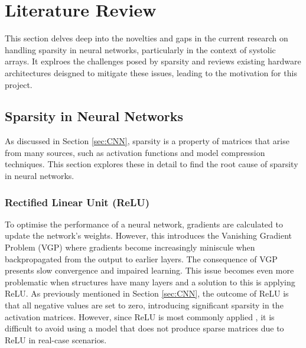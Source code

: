 \documentclass[12pt, a4paper, ukenglish]{article}
\begin{document}
\section{Literature Review} \label{sec: literature review}


    This section delves deep into the novelties and gaps in the current research on handling sparsity in neural networks, particularly in the context of systolic arrays. It explroes the challenges posed by sparsity and reviews existing hardware architectures deisgned to mitigate these issues, leading to the motivation for this project.

    \subsection{Sparsity in Neural Networks} \label{sec: sparsity in nn}
    As discussed in Section \ref{sec:CNN}, sparsity is a property of matrices that arise from many sources, such as activation functions and model compression techniques. This section explores these in detail to find the root cause of sparsity in neural networks. 
        \subsubsection{Rectified Linear Unit (ReLU)} \label{sec: relu}
        To optimise the performance of a neural network, gradients are calculated to update the network's weights. However, this introduces the Vanishing Gradient Problem (VGP) where gradients become increasingly miniscule when backpropagated from the output to earlier layers. The consequence of VGP presents slow convergence and impaired learning. This issue becomes even more problematic when structures have many layers and a solution to this is applying ReLU. As previously mentioned in Section \ref{sec:CNN}, the outcome of ReLU is that all negative values are set to zero, introducing significant sparsity in the activation matrices. However, since ReLU is most commonly applied \cite{sun_sense_2023}, it is difficult to avoid using a model that does not produce sparse matrices due to ReLU in real-case scenarios.
\end{document}
